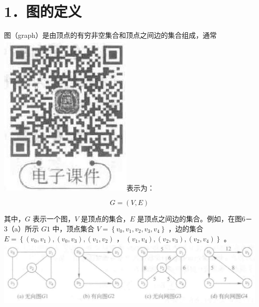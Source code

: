 \documentclass[10pt]{article}
\begin{document}
\section*{1．图的定义}
图（graph）是由顶点的有穷非空集合和顶点之间边的集合组成，通常\\
\includegraphics[max width=\textwidth]{2025_06_06_704745ea57b15b2333e5g-186}表示为：

$$
G=(V, E)
$$

其中，$G$ 表示一个图，$V$ 是顶点的集合，$E$ 是顶点之间边的集合。例如，在图6－3（a）所示 $G 1$ 中，顶点集合 $V=\left\{v_{0}, v_{1}, v_{2}, v_{3}, v_{4}\right\}$ ，边的集合 $E=\left\{\left(v_{0}, v_{1}\right),\left(v_{0}, v_{3}\right),\left(v_{1}, v_{2}\right)\right.$ ， $\left.\left(v_{1}, v_{4}\right),\left(v_{2}, v_{3}\right),\left(v_{2}, v_{4}\right)\right\}$ 。\\
\includegraphics[max width=\textwidth, center]{2025_06_06_704745ea57b15b2333e5g-186(1)}
\end{document}
